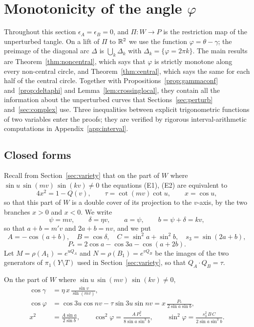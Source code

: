 \section{Monotonicity of the angle \texorpdfstring{$\varphi$}{phi}}\label{sec:monotone}

Throughout this section $\epsilon_A=\epsilon_B=0$, and $\Pi\colon W\to P$ is the restriction map of the unperturbed
tangle. On a lift of $\Pi$ to $\mathbb{R}^2$ we use the function $\varphi=\theta-\gamma$; the preimage of the diagonal arc $\Delta$
is $\bigcup_k\Delta_k$ with $\Delta_k=\{\varphi=2\pi k\}$. The main results are Theorem~\ref{thm:noncentral}, which says that
$\varphi$ is strictly monotone along every non-central circle, and Theorem~\ref{thm:central}, which says the same for
each half of the central circle. Together with Propositions~\ref{prop:gammaconf} and~\ref{prop:deltaphi} and
Lemma~\ref{lem:crossinglocal}, they contain all the information about the unperturbed curves that
Sections~\ref{sec:perturb} and~\ref{sec:complex} use. Three inequalities between explicit trigonometric functions of
two variables enter the proofs; they are verified by rigorous interval-arithmetic computations in
Appendix~\ref{app:interval}.

\subsection{Closed forms}\label{subsec:closedforms}

Recall from Section~\ref{sec:variety} that on the part of $W$ where $\sin u\,\sin(mv)\,\sin(kv)\neq0$ the equations
(E1), (E2) are equivalent to
\[
4x^2=1-Q(v),\qquad \tau=\cot(mv)\cot u,\qquad x=\cos u,
\]
so that this part of $W$ is a double cover of its projection to the $v$-axis, by the two branches $x>0$ and $x<0$.
We write
\[
\psi=mv,\qquad \delta=\eta v,\qquad a=\psi,\qquad b=\psi+\delta=kv,
\]
so that $a+b=m'v$ and $2a+b=nv$, and we put
\[
A=-\cos(a+b),\quad B=\cos\delta,\quad C=\sin^2a+\sin^2b,\quad s_3=\sin(2a+b),
\]
\[
P_*=2\cos a-\cos3a-\cos(a+2b).
\]
Let $M=\rho(A_1)=e^{uQ_A}$ and $N=\rho(B_1)=e^{vQ_B}$ be the images of the two generators of $\pi_1(Y\setminus T)$
used in Section~\ref{sec:variety}, so that $Q_A\cdot Q_B=\tau$.

\begin{lemma}\label{lem:closedforms}
On the part of $W$ where $\sin u\,\sin(mv)\,\sin(kv)\neq0$,
\begin{align}
\cos\gamma&=\eta\,x\,\frac{\sin v}{\sin(mv)}, \label{eq:cosgamma}\\
\cos\varphi&=\cos3u\cos nv-\tau\sin3u\sin nv=x\,\frac{P_*}{2\sin a\sin b}, \label{eq:cosphi}\\
x^2&=\frac{A\sin a}{2\sin b},\qquad
\cos^2\varphi=\frac{A\,P_*^2}{8\sin a\sin^3b},\qquad
\sin^2\varphi=\frac{s_3^2\,B\,C}{2\sin a\sin^3b}. \label{eq:sin2phi}
\end{align}
\end{lemma}

